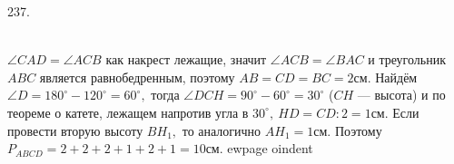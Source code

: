 237. \begin{figure}[ht!]
\end{figure}\\
$\angle CAD=\angle ACB$ как накрест лежащие, значит $\angle ACB=\angle BAC$ и треугольник $ABC$ является равнобедренным, поэтому $AB=CD=BC=2$см. Найдём $\angle D=180^\circ-120^\circ=60^\circ,$ тогда $\angle DCH=90^\circ-60^\circ=30^\circ$ ($CH$ --- высота) и по теореме о катете, лежащем напротив угла в $30^\circ,\ HD=CD:2=1$см. Если провести вторую высоту $BH_1,$ то аналогично $AH_1=1$см. Поэтому $P_{ABCD}=2+2+2+1+2+1=10$см.
ewpage
oindent
